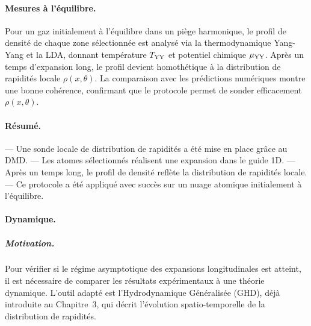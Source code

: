 \paragraph{Mesures à l’équilibre.}  
Pour un gaz initialement à l’équilibre dans un piège harmonique, le profil de densité de chaque zone sélectionnée est analysé via la thermodynamique Yang-Yang et la LDA, donnant température \(T_{\rm YY}\) et potentiel chimique \(\mu_{\rm YY}\). Après un temps d’expansion long, le profil devient homothétique à la distribution de rapidités locale \(\rho(x,\theta)\). La comparaison avec les prédictions numériques montre une bonne cohérence, confirmant que le protocole permet de sonder efficacement \(\rho(x,\theta)\).

\paragraph{Résumé.}  
— Une sonde locale de distribution de rapidités a été mise en place grâce au DMD.  
— Les atomes sélectionnés réalisent une expansion dans le guide 1D.  
— Après un temps long, le profil de densité reflète la distribution de rapidités locale.  
— Ce protocole a été appliqué avec succès sur un nuage atomique initialement à l’équilibre.

\paragraph{Dynamique.}
\subparagraph{Motivation.}
Pour vérifier si le régime asymptotique des expansions longitudinales est atteint, il est nécessaire de comparer les résultats expérimentaux à une théorie dynamique. L’outil adapté est l’Hydrodynamique Généralisée (GHD), déjà introduite au Chapitre~3, qui décrit l’évolution spatio-temporelle de la distribution de rapidités.

